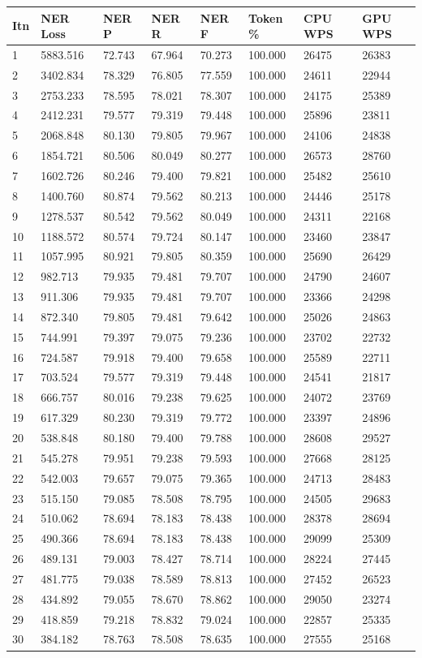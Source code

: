 \documentclass[12pt,a4paper,]{scrartcl}
\begin{document}
\begin{longtable}[]{@{}llllllll@{}}
\toprule
Itn & NER Loss & NER P & NER R & NER F & Token \% & CPU WPS & GPU WPS\tabularnewline
\midrule
\endhead
1 & 5883.516 & 72.743 & 67.964 & 70.273 & 100.000 & 26475 & 26383\tabularnewline
2 & 3402.834 & 78.329 & 76.805 & 77.559 & 100.000 & 24611 & 22944\tabularnewline
3 & 2753.233 & 78.595 & 78.021 & 78.307 & 100.000 & 24175 & 25389\tabularnewline
4 & 2412.231 & 79.577 & 79.319 & 79.448 & 100.000 & 25896 & 23811\tabularnewline
5 & 2068.848 & 80.130 & 79.805 & 79.967 & 100.000 & 24106 & 24838\tabularnewline
6 & 1854.721 & 80.506 & 80.049 & 80.277 & 100.000 & 26573 & 28760\tabularnewline
7 & 1602.726 & 80.246 & 79.400 & 79.821 & 100.000 & 25482 & 25610\tabularnewline
8 & 1400.760 & 80.874 & 79.562 & 80.213 & 100.000 & 24446 & 25178\tabularnewline
9 & 1278.537 & 80.542 & 79.562 & 80.049 & 100.000 & 24311 & 22168\tabularnewline
10 & 1188.572 & 80.574 & 79.724 & 80.147 & 100.000 & 23460 & 23847\tabularnewline
11 & 1057.995 & 80.921 & 79.805 & 80.359 & 100.000 & 25690 & 26429\tabularnewline
12 & 982.713 & 79.935 & 79.481 & 79.707 & 100.000 & 24790 & 24607\tabularnewline
13 & 911.306 & 79.935 & 79.481 & 79.707 & 100.000 & 23366 & 24298\tabularnewline
14 & 872.340 & 79.805 & 79.481 & 79.642 & 100.000 & 25026 & 24863\tabularnewline
15 & 744.991 & 79.397 & 79.075 & 79.236 & 100.000 & 23702 & 22732\tabularnewline
16 & 724.587 & 79.918 & 79.400 & 79.658 & 100.000 & 25589 & 22711\tabularnewline
17 & 703.524 & 79.577 & 79.319 & 79.448 & 100.000 & 24541 & 21817\tabularnewline
18 & 666.757 & 80.016 & 79.238 & 79.625 & 100.000 & 24072 & 23769\tabularnewline
19 & 617.329 & 80.230 & 79.319 & 79.772 & 100.000 & 23397 & 24896\tabularnewline
20 & 538.848 & 80.180 & 79.400 & 79.788 & 100.000 & 28608 & 29527\tabularnewline
21 & 545.278 & 79.951 & 79.238 & 79.593 & 100.000 & 27668 & 28125\tabularnewline
22 & 542.003 & 79.657 & 79.075 & 79.365 & 100.000 & 24713 & 28483\tabularnewline
23 & 515.150 & 79.085 & 78.508 & 78.795 & 100.000 & 24505 & 29683\tabularnewline
24 & 510.062 & 78.694 & 78.183 & 78.438 & 100.000 & 28378 & 28694\tabularnewline
25 & 490.366 & 78.694 & 78.183 & 78.438 & 100.000 & 29099 & 25309\tabularnewline
26 & 489.131 & 79.003 & 78.427 & 78.714 & 100.000 & 28224 & 27445\tabularnewline
27 & 481.775 & 79.038 & 78.589 & 78.813 & 100.000 & 27452 & 26523\tabularnewline
28 & 434.892 & 79.055 & 78.670 & 78.862 & 100.000 & 29050 & 23274\tabularnewline
29 & 418.859 & 79.218 & 78.832 & 79.024 & 100.000 & 22857 & 25335\tabularnewline
30 & 384.182 & 78.763 & 78.508 & 78.635 & 100.000 & 27555 & 25168\tabularnewline
\bottomrule
\end{longtable}
\end{document}
